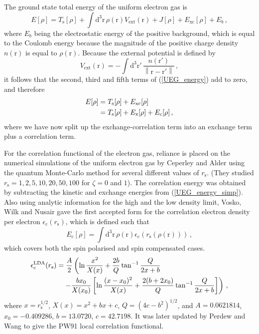 \documentclass{article}
\theoremstyle{plain}\theoremheaderfont{\normalfont\itshape}\theorembodyfont{\rmfamily}\theoremseparator{.}\newtheorem*{rem}{Remark}\newtheorem*{ex}{Example}\newtheorem*{proof}{Proof}\newtheorem*{altp}{Alternative proof}
\theoremstyle{plain}\theoremheaderfont{\normalfont\bfseries}\theorembodyfont{\rmfamily}\theoremseparator{.}\newtheorem{thm}{Theorem}[section]\newtheorem{lem}[thm]{Lemma}\newtheorem{prop}[thm]{Proposition}\newtheorem*{cor}{Corollary}\newtheorem{defn}[thm]{Definition}\newtheorem{clm}[thm]{Claim}\newtheorem{clminproof}{Claim}
\theoremstyle{break}\theoremheaderfont{\normalfont\itshape}\theorembodyfont{\rmfamily}\theoremseparator{.\medskip}\newtheorem*{proofskip}{Proof}\newtheorem*{exs}{Examples}\newtheorem*{rems}{Remarks}
\theoremstyle{break}\theoremheaderfont{\normalfont\bfseries}\theorembodyfont{\rmfamily}\theoremseparator{.\medskip}\newtheorem{lemskip}[thm]{Lemma}\newtheorem{defnskip}[thm]{Definition}\newtheorem{propskip}[thm]{Proposition}\newtheorem{thmskip}[thm]{Theorem}
\numberwithin{equation}{section}
\newcommand{\dd}[2][]{\mathrm{d}^{#1} #2\,}
\newcommand{\vb}[1]{\bm{\mathrm{#1}}}
\newcommand{\norm}[1]{\left\| #1 \right\|}
\newcommand{\ext}{_{\text{ext}}}
\newcommand{\s}{_{\text{s}}}
\newcommand{\x}{_{\text{x}}}
\newcommand{\corr}{_{\text{c}}}
\newcommand{\xc}{_{\text{xc}}}
\begin{document}
    The ground state total energy of the uniform electron gas is
    \begin{equation}\label{UEG_energy}
        E[\rho]=T\s[\rho]+\int\dd[3]{\vb{r}}\rho(\vb{r})V\ext(\vb{r})+J[\rho]+E\xc[\rho]+E_b\,,
    \end{equation}
    where \(E_b\) being the electrostatic energy of the positive background, which is equal to the Coulomb energy because the magnitude of the positive charge density \(n(\vb{r})\) is equal to \(\rho(\vb{r})\). Because the external potential is defined by
    \begin{equation}
        V\ext(\vb{r})=-\int\dd[3]{\vb{r}'}\frac{n(\vb{r}')}{\norm{\vb{r}-\vb{r}'}}\,,
    \end{equation}
    it follows that the second, third and fifth terms of (\ref{UEG_energy}) add to zero, and therefore
    \begin{align}
        E[\rho]&=T\s[\rho]+E\xc[\rho]\notag\\
        &=T\s[\rho]+E\x[\rho]+E\corr[\rho]\,, \label{UEG_energy_simp}
    \end{align}
    where we have now split up the exchange-correlation term into an exchange term plus a correlation term.

    For the correlation functional of the electron gas, reliance is placed on the numerical simulations of the uniform electron gas by Ceperley and Alder using the quantum Monte-Carlo method for several different values of \(r\s\). (They studied \(r\s=1,2,5,10,20,50,100\) for \(\zeta=0\) and \(1\)). The correlation energy was obtained by subtracting the kinetic and exchange energies from (\ref{UEG_energy_simp}). Also using analytic information for the high and the low density limit, Vosko, Wilk and Nusair gave the first accepted form for the correlation electron density per electron \(\epsilon\corr(r\s)\), which is defined such that
    \begin{equation}
        E\corr[\rho]=\int\dd[3]{\vb{r}}\rho(\vb{r})\epsilon\corr(r\s(\rho(\vb{r})))\,,
    \end{equation}
    which covers both the spin polarised and spin compensated cases.
    \begin{align}
        \epsilon\corr^{\text{LDA}}(r\s)&=\frac{A}{2}\left(\ln\frac{x^2}{X(x)}+\frac{2b}{Q}\tan^{-1}\frac{Q}{2x+b}\right.\notag\\
        &\quad \left.-\frac{bx_0}{X(x_0)}\left[\ln\frac{(x-x_0)^2}{X(x)}+\frac{2(b+2x_0)}{Q}\tan^{-1}\frac{Q}{2x+b}\right]\right)\,,
    \end{align}
    where \(x=r\s^{1/2}\), \(X(x)=x^2+bx+c\), \(Q=(4c-b^2)^{1/2}\), and \(A=0.0621814\), \(x_0=-0.409286\), \(b=13.0720\), \(c=42.7198\). It was later updated by Perdew and Wang to give the PW91 local correlation functional.
\end{document}
